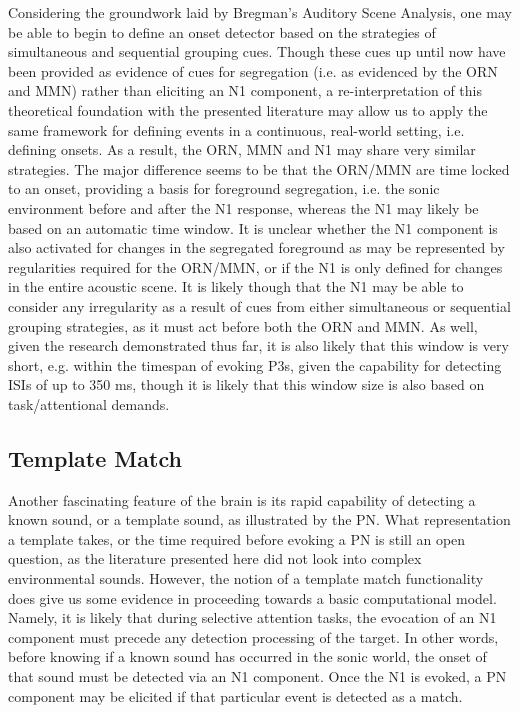 \documentclass[a4paper,10pt,final]{ThesisStyle}
\begin{document}
Considering the groundwork laid by Bregman's Auditory Scene Analysis, one may be able to begin to define an onset detector based on the strategies of simultaneous and sequential grouping cues.  Though these cues up until now have been provided as evidence of cues for segregation (i.e. as evidenced by the ORN and MMN) rather than eliciting an N1 component, a re-interpretation of this theoretical foundation with the presented literature may allow us to apply the same framework for defining events in a continuous, real-world setting, i.e. defining onsets.  As a result, the ORN, MMN and N1 may share very similar strategies.  The major difference seems to be that the ORN/MMN are time locked to an onset, providing a basis for foreground segregation, i.e. the sonic environment before and after the N1 response, whereas the N1 may likely be based on an automatic time window.  It is unclear whether the N1 component is also activated for changes in the segregated foreground as may be represented by regularities required for the ORN/MMN, or if the N1 is only defined for changes in the entire acoustic scene.  It is likely though that the N1 may be able to consider any irregularity as a result of cues from either simultaneous or sequential grouping strategies, as it must act before both the ORN and MMN.  As well, given the research demonstrated thus far, it is also likely that this window is very short, e.g. within the timespan of evoking P3s, given the capability for detecting ISIs of up to 350 ms, though it is likely that this window size is also based on task/attentional demands.  

\subsection{Template Match}

Another fascinating feature of the brain is its rapid capability of detecting a known sound, or a template sound, as illustrated by the PN.  What representation a template takes, or the time required before evoking a PN is still an open question, as the literature presented here did not look into complex environmental sounds.  However, the notion of a template match functionality does give us some evidence in proceeding towards a basic computational model.  Namely, it is likely that during selective attention tasks, the evocation of an N1 component must precede any detection processing of the target.  In other words, before knowing if a known sound has occurred in the sonic world, the onset of that sound must be detected via an N1 component.  Once the N1 is evoked, a PN component may be elicited if that particular event is detected as a match. 
\end{document}
